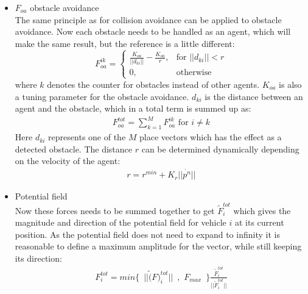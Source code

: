 \begin{itemize}
\item $F_{oa}$ obstacle avoidance\\
The same principle as for collision avoidance can be applied to obstacle avoidance. Now each obstacle needs to be handled as an agent, which will make the same result, but the reference is a little different:
\[
    F_{oa}^{ik}= 
\begin{cases}
    \frac{K_{oa}}{||d_{ki}||}-\frac{K_{oa}}{r},& \text{for } ||d_{ki}||<r\\
    0,              & \text{otherwise}
\end{cases}
\]
where $k$ denotes the counter for obstacles instead of other agents. $K_{oa}$ is also a tuning parameter for the obstacle avoidance. $d_{ki}$ is the distance between an agent and the obstacle, which in a total term is summed up as:
\begin{align}
F_{oa}^{tot} = \sum\limits_{k=1}^MF_{oa}^{ik} \text{ for } i\neq k
\end{align}
Here $d_{ki}$ represents one of the $M$ place vectors which has the effect as a detected obstacle.
The distance $r$ can be determined dynamically depending on the velocity of the agent:
\begin{align}
r = r^{min} + K_r||\dot{p^n}||
\end{align}

\item Potential field\\
Now these forces needs to be summed together to get $\tilde{F}_i^{tot}$ which gives the magnitude and direction of the potential field for vehicle $i$ at its current position. As the potential field does not need to expand to infinity it is reasonable to define a maximum amplitude for the vector, while still keeping its direction:
\begin{align}
F_i^{tot} = min\{\,\,\,||\tilde(F)_i^{tot}||\,\,\,,\,\,F_{max}\,\,\,\}\frac{\tilde{F}_i^{tot}}{||\tilde{F}_i^{tot}||}
\end{align}

\end{itemize}





